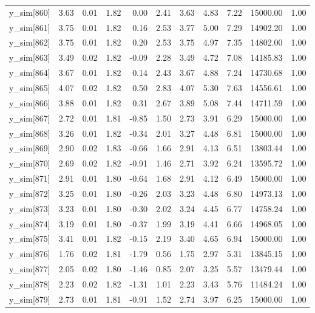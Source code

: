 \begin{table}[ht]
\begin{tabular}{rrrrrrrrrrr}
  y\_sim[860] & 3.63 & 0.01 & 1.82 & 0.00 & 2.41 & 3.63 & 4.83 & 7.22 & 15000.00 & 1.00 \\ 
  y\_sim[861] & 3.75 & 0.01 & 1.82 & 0.16 & 2.53 & 3.77 & 5.00 & 7.29 & 14902.20 & 1.00 \\ 
  y\_sim[862] & 3.75 & 0.01 & 1.82 & 0.20 & 2.53 & 3.75 & 4.97 & 7.35 & 14802.00 & 1.00 \\ 
  y\_sim[863] & 3.49 & 0.02 & 1.82 & -0.09 & 2.28 & 3.49 & 4.72 & 7.08 & 14185.83 & 1.00 \\ 
  y\_sim[864] & 3.67 & 0.01 & 1.82 & 0.14 & 2.43 & 3.67 & 4.88 & 7.24 & 14730.68 & 1.00 \\ 
  y\_sim[865] & 4.07 & 0.02 & 1.82 & 0.50 & 2.83 & 4.07 & 5.30 & 7.63 & 14556.61 & 1.00 \\ 
  y\_sim[866] & 3.88 & 0.01 & 1.82 & 0.31 & 2.67 & 3.89 & 5.08 & 7.44 & 14711.59 & 1.00 \\ 
  y\_sim[867] & 2.72 & 0.01 & 1.81 & -0.85 & 1.50 & 2.73 & 3.91 & 6.29 & 15000.00 & 1.00 \\ 
  y\_sim[868] & 3.26 & 0.01 & 1.82 & -0.34 & 2.01 & 3.27 & 4.48 & 6.81 & 15000.00 & 1.00 \\ 
  y\_sim[869] & 2.90 & 0.02 & 1.83 & -0.66 & 1.66 & 2.91 & 4.13 & 6.51 & 13803.44 & 1.00 \\ 
  y\_sim[870] & 2.69 & 0.02 & 1.82 & -0.91 & 1.46 & 2.71 & 3.92 & 6.24 & 13595.72 & 1.00 \\ 
  y\_sim[871] & 2.91 & 0.01 & 1.80 & -0.64 & 1.68 & 2.91 & 4.12 & 6.49 & 15000.00 & 1.00 \\ 
  y\_sim[872] & 3.25 & 0.01 & 1.80 & -0.26 & 2.03 & 3.23 & 4.48 & 6.80 & 14973.13 & 1.00 \\ 
  y\_sim[873] & 3.23 & 0.01 & 1.80 & -0.30 & 2.02 & 3.24 & 4.45 & 6.77 & 14758.24 & 1.00 \\ 
  y\_sim[874] & 3.19 & 0.01 & 1.80 & -0.37 & 1.99 & 3.19 & 4.41 & 6.66 & 14968.05 & 1.00 \\ 
  y\_sim[875] & 3.41 & 0.01 & 1.82 & -0.15 & 2.19 & 3.40 & 4.65 & 6.94 & 15000.00 & 1.00 \\ 
  y\_sim[876] & 1.76 & 0.02 & 1.81 & -1.79 & 0.56 & 1.75 & 2.97 & 5.31 & 13845.15 & 1.00 \\ 
  y\_sim[877] & 2.05 & 0.02 & 1.80 & -1.46 & 0.85 & 2.07 & 3.25 & 5.57 & 13479.44 & 1.00 \\ 
  y\_sim[878] & 2.23 & 0.02 & 1.82 & -1.31 & 1.01 & 2.23 & 3.43 & 5.76 & 11484.24 & 1.00 \\ 
  y\_sim[879] & 2.73 & 0.01 & 1.81 & -0.91 & 1.52 & 2.74 & 3.97 & 6.25 & 15000.00 & 1.00 \\ 

\end{tabular}
\end{table}
